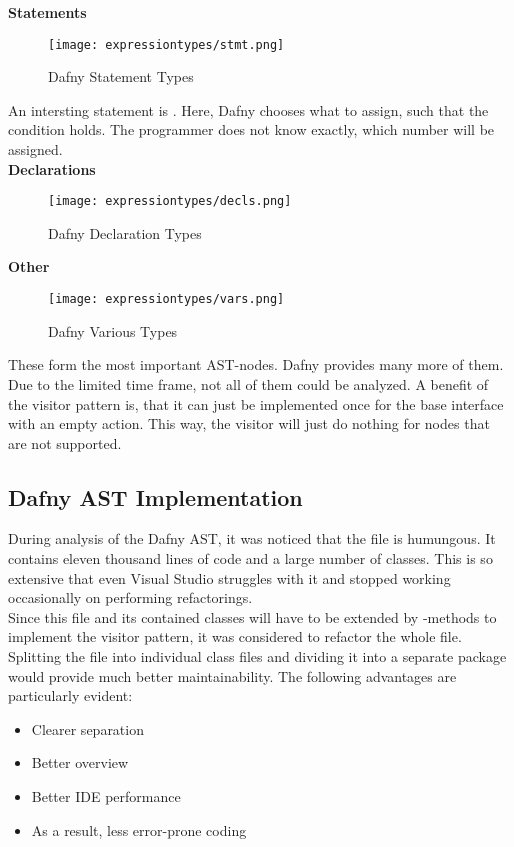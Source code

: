\pagebreak
\textbf{Statements}\\
\begin{figure}[H]
    \centering
    \texttt{[image: expressiontypes/stmt.png]}
    \caption{Dafny Statement Types}
    \label{fig:dafny_stmt}
\end{figure}

An intersting statement is .
Here, Dafny chooses what to assign, such that the condition holds.
The programmer does not know exactly, which number will be assigned.\\

\textbf{Declarations}\\
\begin{figure}[H]
    \centering
    \texttt{[image: expressiontypes/decls.png]}
    \caption{Dafny Declaration Types}
    \label{fig:dafny_decl}
\end{figure}

\pagebreak
\textbf{Other}
\begin{figure}[H]
    \centering
    \texttt{[image: expressiontypes/vars.png]}
    \caption{Dafny Various Types}
    \label{fig:dafny_vars}
\end{figure}


These form the most important AST-nodes.
Dafny provides many more of them.
Due to the limited time frame, not all of them could be analyzed.
A benefit of the visitor pattern is, that it can just be implemented once for the base interface  with an empty action.
This way, the visitor will just do nothing for nodes that are not supported.

\subsection{Dafny AST Implementation}
During analysis of the Dafny AST, it was noticed that the file  is humungous.
It contains eleven thousand lines of code and a large number of classes.
This is so extensive that even Visual Studio struggles with it and stopped working occasionally on performing refactorings.\\

Since this file and its contained classes will have to be extended by -methods
to implement the visitor pattern, it was considered to refactor the whole file.\\

Splitting the file into individual class files and dividing it into a separate package would provide much better maintainability.
The following advantages are particularly evident:
\begin{itemize}
    \item Clearer separation
    \item Better overview
    \item Better IDE performance
    \item As a result, less error-prone coding
\end{itemize}


